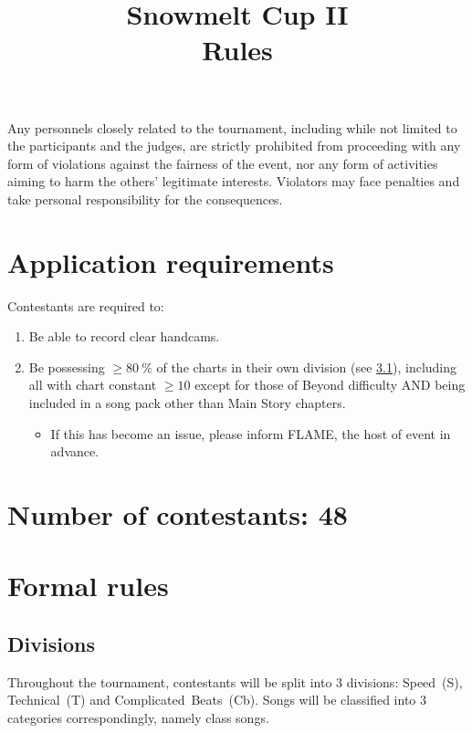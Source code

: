 \documentclass{article}
\title{{Snowmelt Cup II}\\{\Huge Rules}}
\author{}
\date{}
\newcommand{\alert}[1]{{\color{red} #1}}
\newcommand{\beyond}{\textsf{Beyond}}
\begin{document}
\maketitle
\alert{
	Any personnels closely related to the tournament,
	including while not limited to
	the participants and the judges,
	are strictly prohibited from
	proceeding with any form of
	violations against the fairness of the event,
	nor any form of activities aiming to
	harm the others' legitimate interests.
	Violators may face penalties
	and take personal responsibility for the consequences.
}

\section{Application requirements} \label{sec:application-requirements}

Contestants are required to:

\begin{enumerate}
	\item Be able to record clear handcams.
	\item Be possessing $\geq \qty{80}{\percent}$ of the charts
	      in their own division (see \cref{subsect:divisions}),
	      including all with chart constant $\geq 10$
	      except for those of \beyond{} difficulty
	      AND being included in a song pack other than
	      Main Story chapters.
	      \begin{itemize}
		      \item If this has become an issue,
		            please inform FLAME, the host of event in advance.
	      \end{itemize}
\end{enumerate}

\section{Number of contestants: 48}

\section{Formal rules}

\subsection{Divisions}\label{subsect:divisions}

Throughout the tournament,
contestants will be split into 3 divisions:
Speed~(S), Technical~(T) and Complicated~Beats~(Cb).
Songs will be classified
into 3 categories correspondingly,
namely class songs.
\end{document}
